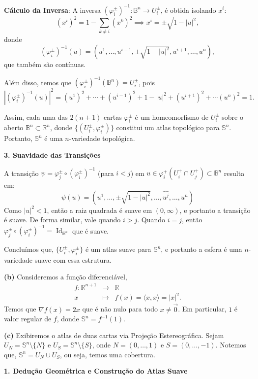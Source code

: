 {	\textbf{Cálculo da Inversa}: A inversa $(\varphi_i^{\pm})^{-1}: \mathbb{B}^n\rightarrow U_i^{\pm}$, é obtida isolando $x^i$:
	$$(x^i)^2 = 1 - \sum_{k \neq i} (x^k)^2 \implies x^i = \pm \sqrt{1 - |u|^2},$$ 
	donde
	$$(\varphi_i^{\pm})^{-1}(u)=(u^1, \dots, u^{i-1},\pm\sqrt{1-|u|^2}, u^{i+1}, \dots, u^n),$$ que também são contínuas.
	
	Além disso, temos que $(\varphi_i^{\pm})^{-1}(\mathbb{B}^n)=U_i^{\pm}$, pois
	$$|(\varphi_i^{\pm})^{-1}(u)|^2=(u^1)^2+\cdots+(u^{i-1})^2+1-|u|^2+(u^{i+1})^2+\cdots(u^n)^2=1.$$
	
	Assim, cada uma das $2(n+1)$ cartas $\varphi_i^{\pm}$ é um homeomorfismo de $U_i^{\pm}$ sobre o aberto $\mathbb{B}^n \subset \mathbb{R}^n$, donde $\{(U_i^{\pm}, \varphi_i^{\pm})\}$ constitui um atlas topológico para $\mathbb{S}^n$. Portanto, $\mathbb{S}^n$ é uma $n$-variedade topológica.
	
	\textbf{3. Suavidade das Transições}
	
	A transição $\psi = \varphi_j^{\pm} \circ (\varphi_i^{\pm})^{-1}$ (para $i < j$) em $u \in \varphi_i^+(U_i^+ \cap U_j^+)\subset\mathbb{B}^n$ resulta em:
	$$ \psi(u) = (u^1, \dots, \pm\sqrt{1-|u|^2}, \dots, \widehat{u^j}, \dots, u^n) $$
	Como $|u|^2 < 1$, então a raiz quadrada é suave em $(0, \infty)$, e portanto a transição é suave. De forma similar, vale quando $i>j$. Quando $i=j$, então $\varphi_j^{\pm}\circ(\varphi_i^{\pm})^{-1}=\operatorname{Id}_{\mathbb{B}^n}$ que é suave.
	
	Concluímos que, $\{U_i^{\pm},\varphi_i^{\pm}\}$ é um atlas suave para $\mathbb{S}^n$, e portanto a esfera é uma $n$-variedade suave com essa estrutura.
	
	\textbf{(b)} Consideremos a função diferenciável,
	\begin{eqnarray*}
		f: \mathbb{R}^{n+1}&\longrightarrow &\mathbb{R}\\
		x&\longmapsto& f(x)=\langle x,x\rangle=|x|^2.
	\end{eqnarray*}
	Temos que $\nabla f(x) = 2x$ que é não nulo para todo $x\neq \vec{0}$. Em particular, $1$ é valor regular de $f$, donde $\mathbb{S}^n=f^{-1}(1)$.
	
	\textbf{(c)} Exibiremos o atlas de duas cartas via Projeção Estereográfica. Sejam $U_N = \mathbb{S}^n \setminus \{N\}$ e $U_S = \mathbb{S}^n \setminus \{S\}$, onde $N = (0,\dots,1)$ e $S = (0,\dots,-1)$. Notemos que, $\mathbb{S}^n=U_N\cup U_S$, ou seja, temos uma cobertura.
	
	\textbf{1. Dedução Geométrica e Construção do Atlas Suave}
	
}
